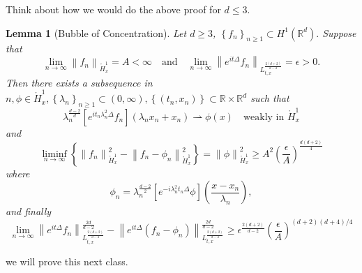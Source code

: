 \documentclass{article}
\newtheorem{lemma}{Lemma}
\def\R{\mathbb{R}} %
\newcommand\norm[1]{\left\lVert#1\right\rVert}
\begin{document}
Think about how we would do the above proof for $d \leq 3$.

\begin{lemma}[Bubble of Concentration]
  \label{lem:bubble-concentration}
  Let $d \geq 3$,  $\left\{f_{n}\right\}_{n\geq1}\subset H^{1}(\R^d).$ Suppose
  that
  \begin{equation*}
    \lim_{n\to\infty} \norm{f_{n}}_{\mathring{H}_{x}^{1}} = A< \infty
    \quad \text{and} \quad
    \lim_{n\to\infty} \norm{e^{it\Delta}f_{n}}_{L_{t,x}^{\frac{2(d+2)}{d-2}}}=\epsilon>0.
  \end{equation*}
  Then there exists a subsequence in $n,\phi\in \mathring{H}^{1}_{x},
  \left\{\lambda_{n}\right\}_{n \geq 1}\subset (0,\infty),
  \left\{(t_{n},x_{n})\right\}\subset \R\times \R^{d}$ such that
  \begin{equation*}
    \lambda_{n}^{\frac{d-2}{d}}\left[ e^{it_{n}\lambda_{n}^{2}\Delta}f_{n}
    \right](\lambda_{n}x_{n}+x_{n})\rightharpoonup \phi(x) \quad \text{weakly
      in }\mathring{H}^{1}_{x}
  \end{equation*}
  and
  \begin{equation*}
    \liminf_{n\to\infty} \left\{\norm{f_{n}}_{\mathring{H}^{1}_{x}}^{2}-
      \norm{f_{n}-\phi_{n}}_{\mathring{H}_{x}^{1}}^{2}\right\} =
    \norm{\phi}_{\mathring{H}^{1}_{x}}^{2} \geq A^{2}\left( \frac{\epsilon}{A}
    \right)^{\frac{d(d+2)}{4}} 
  \end{equation*}
  where
  \begin{equation*}
    \phi_{n} = \lambda_{n}^{\frac{d-2}{2}} \left[ e^{-i\lambda_{n}^{2}t_{n}\Delta}\phi \right]\left( \frac{x-x_{n}}{\lambda_{n}} \right),
  \end{equation*}
  and finally
  \begin{equation*}
    \lim_{n\to\infty}  \norm{e^{it\Delta}f_{n}}_{L_{t,x}^{\frac{2(d+2)}{d-2}}}^{\frac{2d}{d-2}} - \norm{e^{it\Delta}\left( f_{n}-\phi_{n} \right) }_{L_{t,x}^{\frac{2(d+2)}{d-2}}}^{\frac{2d}{d-2}} \geq \epsilon^{\frac{2(d+2)}{d-2}} \left( \frac{\epsilon}{A} \right)^{(d+2)(d+4)/4} 
  \end{equation*}
\end{lemma}

we will prove this next class.
\end{document}
